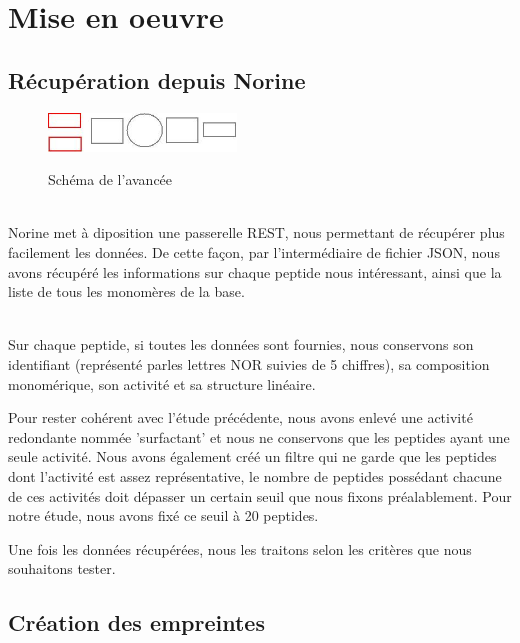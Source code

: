 \documentclass[a4paper,10pt]{report}
\begin{document}
   
  \chapter{Mise en oeuvre}

  
    \section{Récupération depuis Norine}
    
	\begin{figure}[!h]
	    \begin{center}
	      \includegraphics[width=5cm]{image/step1.jpeg} \\
	      \caption{Schéma de l'avancée}
	    \end{center}
	 \end{figure}
	   
	\\
	Norine met à diposition une passerelle REST, nous permettant de récupérer plus facilement les données.
	De cette façon, par l'intermédiaire de fichier JSON, nous avons récupéré les informations sur chaque peptide nous intéressant, ainsi que la liste de tous les monomères de la base.
	
	    
	~\\ Sur chaque peptide, si toutes les données sont fournies, nous conservons son identifiant (représenté parles lettres NOR suivies de 5 chiffres), sa composition monomérique, son activité et sa structure linéaire. 
	    
	Pour rester cohérent avec l'étude précédente, nous avons enlevé une activité redondante nommée 'surfactant' et nous ne conservons que les peptides ayant une seule activité.
	Nous avons également créé un filtre qui ne garde que les peptides dont l'activité est assez représentative, le nombre de peptides possédant chacune de ces activités doit dépasser un certain seuil que nous fixons préalablement. Pour notre étude, nous avons fixé ce seuil à 20 peptides.
      
	Une fois les données récupérées, nous les traitons selon les critères que nous souhaitons tester.   
   
    \section{Création des empreintes}
	
\end{document}
